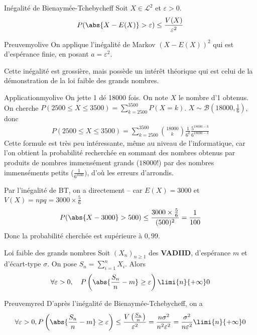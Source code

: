     \begin{prop}{Inégalité de Bienaymée-Tchebycheff}{}
        Soit $X \in \mathcal{L}^2$ et $\varepsilon > 0$.
        \[ P(\abs{X - E(X)} > \varepsilon) \leq \frac{V(X)}{\varepsilon^2} \]   
    \end{prop}

    \begin{demo}{Preuve}{myolive}
        On applique l’inégalité de Markov $(X - E(X))^2$ qui est d’espérance finie, en posant $a = \varepsilon^2$.
    \end{demo}

    Cette inégalité est grossière, mais possède un intérêt théorique qui est celui de la démonstration de la loi faible des grands nombres. 

    \begin{omed}{Application}{myolive}
        On jette 1 dé 18000 fois. On note $X$ le nombre d’1 obtenus. On cherche $P(2500 \leq X \leq 3500) = \sum_{k=2500}^{3500} P(X = k)$. $X \sim \mathcal{B}(18000,\frac{1}{6})$, donc 
        \begin{align*}
            P(2500 \leq X \leq 3500) = \sum_{k=2500}^{3500} \binom{18000}{k} \frac{1}{6^k} \frac{5^{18000-k}}{6^{18000-k}}
        \end{align*}
        Cette formule est très peu intéressante, même au niveau de l’informatique, car l’on obtient la probabilité recherchée en sommant des nombres obtenus par produits de nombres immensément grands ($18 000!$) par des nombres immenséments petits ($\frac{1}{6^{3500}})$, d’où les erreurs d’arrondis.

        Par l’inégalité de BT, on a directement -- car $E(X) = 3000$ et $V(X) = npq = 3000 \times \frac{5}{6}$
        \[ P(\abs{X - 3000} > 500 ) \leq \frac{3000 \times \frac{5}{6}}{(500)^2}  = \frac{1}{100} \]
        Donc la probabilité cherchée est supérieure à $0,99$.
    \end{omed}
    
    \begin{theo}{Loi faible des grands nombres}{}
        Soit $(X_n)_{n \geq 1}$ des \textbf{\textsc{VADIID}}, d’espérance $m$ et d’écart-type $\sigma$. On pose $S_n = \sum_{i=1}^{n} X_i$. Alors 
        \[ \forall \varepsilon > 0, \quad P\left(\abs{\frac{S_n}{n} - m} \geq \varepsilon\right) \limi{n}{+\infty} 0 \]    
    \end{theo}

    \begin{demo}{Preuve}{myred}
        D’après l’inégalité de Bienaymée-Tchebycheff, on a 
        \[ \forall \varepsilon > 0, P\left(\abs{\frac{S_n}{n} - m} \geq \varepsilon\right) \leq \frac{V\left(\frac{S_n}{n}\right)}{\varepsilon^2} = \frac{n \sigma^2}{n^2 \varepsilon^2} =  \frac{\sigma^2}{n \varepsilon^2} \limi{n}{+\infty} 0 \]   
    \end{demo}


